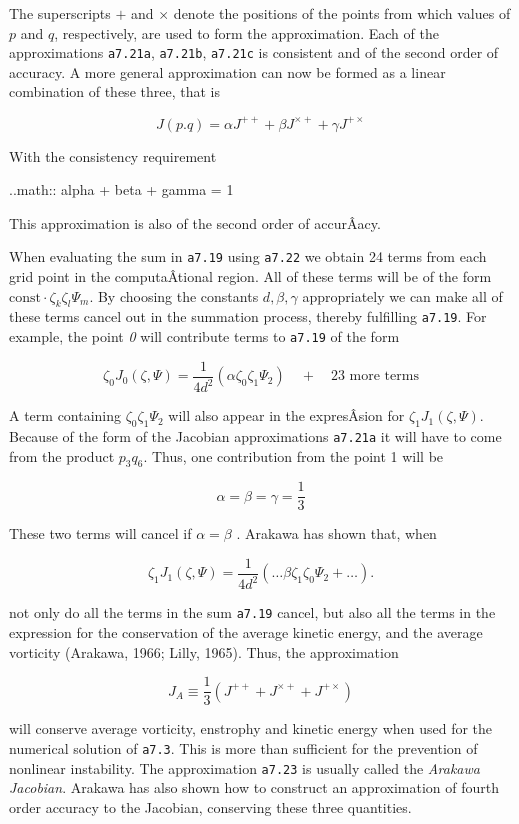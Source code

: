The superscripts \(+\) and \(\times\) denote the positions of the points
from which values of \(p\) and \(q\), respectively, are used to form the
approximation. Each of the approximations \texttt{a7.21a},
\texttt{a7.21b}, \texttt{a7.21c} is consistent and of the second order
of accuracy. A more general approximation can now be formed as a linear
combination of these three, that is

{\[J(p.q) = \alpha J^{++} + \beta J^{\times +} + \gamma J^{+\times}\]}

With the consistency requirement

..math:: alpha + beta + gamma = 1

This approximation is also of the second order of accurÂ­acy.

When evaluating the sum in \texttt{a7.19} using \texttt{a7.22} we obtain
24 terms from each grid point in the computaÂ­tional region. All of these
terms will be of the form
\(\text{const} \cdot\zeta_{k}\zeta_{l}\Psi_{m}\). By choosing the
constants \(d,\beta,\gamma\) appropriately we can make all of these
terms cancel out in the summation process, thereby fulfilling
\texttt{a7.19}. For example, the point \emph{0} will contribute terms to
\texttt{a7.19} of the form

\[\zeta_0 J_0( \zeta,\Psi ) = \frac{1}{4d^{2}}\left( \alpha \zeta_{0} \zeta_{1}\Psi_{2} \right)
\quad + \quad \text{23 more terms}\]

A term containing \(\zeta_{0}\zeta_{1}\Psi_{2}\) will also appear in the
expresÂ­sion for \(\zeta_{1}J_{1}\left( \zeta,\Psi \right)\). Because of
the form of the Jacobian approximations \texttt{a7.21a} it will have to
come from the product \(p_{3}q_{6}\). Thus, one contribution from the
point 1 will be

\[\alpha = \beta = \gamma = \frac{1}{3}\]

These two terms will cancel if \(\alpha = \beta\) . Arakawa has shown
that, when

\[\zeta_{1}J_{1}\left( \zeta,\Psi \right) = \frac{1}{4d^{2}}\left( \ldots\beta\zeta_{1}\zeta_{0}\Psi_{2} + \ldots \right).\]

not only do all the terms in the sum \texttt{a7.19} cancel, but also all
the terms in the expression for the conservation of the average kinetic
energy, and the average vorticity (Arakawa, 1966; Lilly, 1965). Thus,
the approximation

{\[J_{A} \equiv \frac{1}{3}\left( J^{+ +} + J^{\times +} + J^{+ \times} \right)\]}

will conserve average vorticity, enstrophy and kinetic energy when used
for the numerical solution of \texttt{a7.3}. This is more than
sufficient for the prevention of nonlinear instability. The
approximation \texttt{a7.23} is usually called the \emph{Arakawa
Jacobian}. Arakawa has also shown how to construct an approximation of
fourth order accuracy to the Jacobian, conserving these three
quantities.


